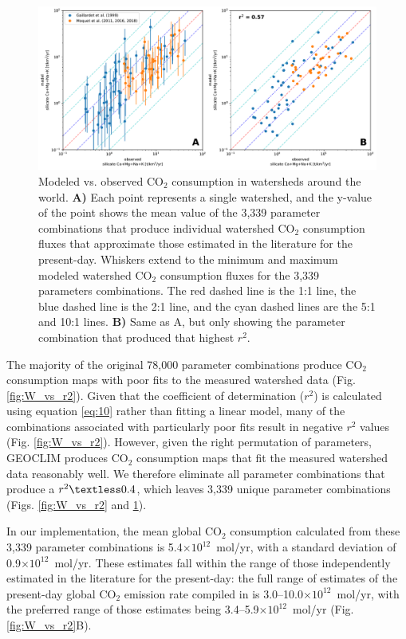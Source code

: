 \documentclass[11pt,letterpaper]{article}
\newcommand{\COtwo}{CO$_{2}$\xspace}
\begin{document}
\begin{figure}[h!]
    \centering
    \includegraphics[width=1\textwidth]{Manuscript/Figures/r2_cross_plot.pdf}
    \caption{Modeled vs. observed \COtwo consumption in watersheds around the world. \textbf{A)} Each point represents a single watershed, and the y-value of the point shows the mean value of the 3,339 parameter combinations that produce individual watershed \COtwo consumption fluxes that approximate those estimated in the literature for the present-day. Whiskers extend to the minimum and maximum modeled watershed \COtwo consumption fluxes for the 3,339 parameters combinations. The red dashed line is the 1:1 line, the blue dashed line is the 2:1 line, and the cyan dashed lines are the 5:1 and 10:1 lines. \textbf{B)} Same as A, but only showing the parameter combination that produced that highest $r^{2}$.}
    \label{fig:r2_cross_plot}
\end{figure}

The majority of the original 78,000 parameter combinations produce \COtwo consumption maps with poor fits to the measured watershed data (Fig. \ref{fig:W_vs_r2}). Given that the coefficient of determination ($r^{2}$) is calculated using equation \ref{eq:10} rather than fitting a linear model, many of the combinations associated with particularly poor fits result in negative $r^{2}$ values (Fig. \ref{fig:W_vs_r2}). However, given the right permutation of parameters, GEOCLIM produces \COtwo consumption maps that fit the measured watershed data reasonably well. We therefore eliminate all parameter combinations that produce a $r^{2}\textless0.4$, which leaves 3,339 unique parameter combinations (Figs. \ref{fig:W_vs_r2} and \ref{fig:r2_cross_plot}).

In our implementation, the mean global CO$_{2}$ consumption calculated from these 3,339 parameter combinations is 5.4$\times10^{12}$~mol/yr, with a standard deviation of 0.9$\times10^{12}$~mol/yr. These estimates fall within the range of those independently estimated in the literature for the present-day: the full range of estimates of the present-day global CO$_{2}$ emission rate compiled in \citet{Gerlach2011a} is 3.0--10.0$\times10^{12}$~mol/yr, with the preferred range of those estimates being 3.4--5.9$\times10^{12}$~mol/yr (Fig. \ref{fig:W_vs_r2}B).
\end{document}
